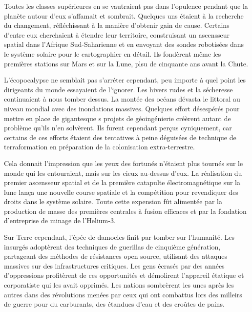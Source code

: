 Toutes les classes supérieures en se vautraient pas dans l'opulence pendant que la planète autour d'eux s'affamait et sombrait. Quelques uns étaient à la recherche du changement, réfléchissant à la manière d'obtenir gain de cause. Certains d'entre eux cherchaient à étendre leur territoire, construisant un ascensseur spatial dans l'Afrique Sud-Saharienne et en envoyant des sondes robotisées dans le système solaire pour le cartographier en détail. Ils fondèrent même les premières stations sur Mars et sur la Lune, plsu de cinquante ans avant la Chute. 

L'écopocalypse ne semblait pas s'arréter cependant, peu importe à quel point les dirigeants du monde essayaient de l'ignorer. Les hivers rudes et la sécheresse continuaient à nous tomber dessus. La montée des océans dévasta le littoral au niveau mondial avec des inondations massives. Quelques effort désespérés pour mettre en place de gigantesque s projets de géoingénierie créèrent autant de problème qu'ils n'en solvèrent. Ils furent  cependant perçus cyniquement, car certains de ces efforts étaient des tentatives à peine déguisées de technique de terraformation en préparation de la colonisation extra-terrestre. 

Cela donnait l'impression que les yeux des fortunés n'étaient plus tournés sur le monde qui les entouraient, mais sur les cieux au-dessus d'eux. La réalisation du premier ascensseur spatial et de la première catapulte électromagnétique sur la lune lança une nouvelle course spatiale et la compétition pour revendiquer des droits dans le système solaire. Toute cette expension fût alimentée par la production de masse des premières centrales à fusion efficaces et par la fondation d'entreprise de minage de l'Helium-3. 

Sur Terre cependant, l'épée de damocles finît par tomber sur l'humanité. Les insurgés adoptèrent des techniques de guerillas de cinquième génération, partageant des méthodes de résistances open source, utilisant des attaques massives sur des infrastructures critiques. Les gens écrasés par des années d'oppressions profitèrent de ces opportunités et démolirent l'appareil étatique et corporatiste qui les avait opprimés. Les nations sombrèrent les unes après les autres dans des révolutions menées par ceux qui ont combattus lors des milleirs de guerre pour du carburants, des étandues d'eau et des croûtes de pains. 

